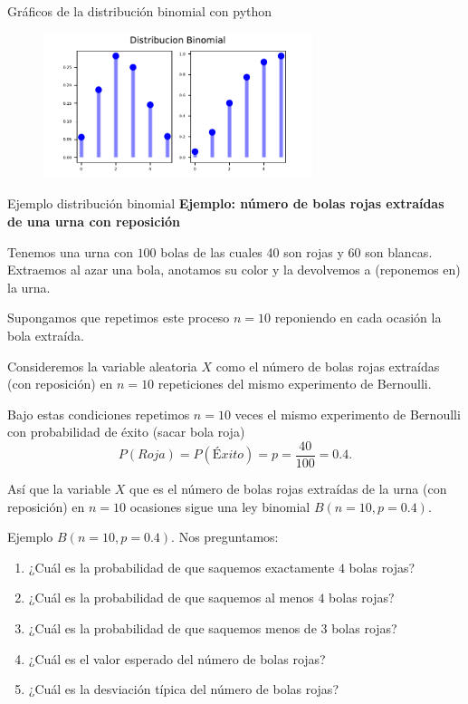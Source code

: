 \documentclass[
  ignorenonframetext,
  aspectratio=169]{beamer}
\providecommand{\tightlist}{%
  \setlength{\itemsep}{0pt}\setlength{\parskip}{0pt}}\usepackage{longtable,booktabs,array}
\begin{document}
\begin{frame}{Gráficos de la distribución binomial con python}
\protect\hypertarget{gruxe1ficos-de-la-distribuciuxf3n-binomial-con-python-2}{}
\begin{figure}

{\centering \includegraphics[width=0.7\textwidth,height=\textheight]{Tema_3_1_Notables_files/figure-beamer/dibu_python2-1.pdf}

}

\end{figure}
\end{frame}

\begin{frame}{Ejemplo distribución binomial}
\protect\hypertarget{ejemplo-distribuciuxf3n-binomial}{}
\textbf{Ejemplo: número de bolas rojas extraídas de una urna con
reposición}

Tenemos una urna con \(100\) bolas de las cuales 40 son rojas y 60 son
blancas. Extraemos al azar una bola, anotamos su color y la devolvemos a
(reponemos en) la urna.

Supongamos que repetimos este proceso \(n=10\) reponiendo en cada
ocasión la bola extraída.

Consideremos la variable aleatoria \(X\) como el número de bolas rojas
extraídas (con reposición) en \(n=10\) repeticiones del mismo
experimento de Bernoulli.

Bajo estas condiciones repetimos \(n=10\) veces el mismo experimento de
Bernoulli con probabilidad de éxito (sacar bola roja)
\[P(Roja)=P(Éxito)=p=\frac{40}{100}=0.4.\]

Así que la variable \(X\) que es el número de bolas rojas extraídas de
la urna (con reposición) en \(n=10\) ocasiones sigue una ley binomial
\(B(n=10,p=0.4).\)
\end{frame}

\begin{frame}{Ejemplo \(B(n=10,p=0.4).\)}
\protect\hypertarget{ejemplo-bn10p0.4.}{}
Nos preguntamos:

\begin{enumerate}
\tightlist
\item
  ¿Cuál es la probabilidad de que saquemos exactamente \(4\) bolas
  rojas?
\item
  ¿Cuál es la probabilidad de que saquemos al menos \(4\) bolas rojas?
\item
  ¿Cuál es la probabilidad de que saquemos menos de \(3\) bolas rojas?
\item
  ¿Cuál es el valor esperado del número de bolas rojas?
\item
  ¿Cuál es la desviación típica del número de bolas rojas?
\end{enumerate}
\end{frame}
\end{document}
